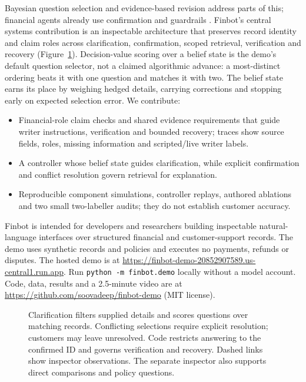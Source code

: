 \documentclass[11pt]{article}
\begin{document}
Bayesian question selection \citep{lindley1956measure} and evidence-based revision
\citep{gao-etal-2023-rarr} address parts of this; financial agents already use confirmation and
guardrails \citep{chua-etal-2025-banking}.
Finbot's central systems contribution is an inspectable architecture that preserves record
identity and claim roles across clarification, confirmation, scoped retrieval, verification and
recovery (Figure~\ref{fig:architecture}). Decision-value scoring over a belief state is the demo's
default question selector, not a claimed algorithmic advance: a most-distinct ordering beats it
with one question and matches it with two. The belief state earns its place by weighing hedged
details, carrying corrections and stopping early on expected selection error. We contribute:
\begin{itemize}\itemsep0pt
\item Financial-role claim checks and shared evidence requirements that guide writer
  instructions, verification and bounded recovery; traces show source fields, roles, missing
  information and scripted/live writer labels.
\item A controller whose belief state guides clarification, while explicit confirmation and
  conflict resolution govern retrieval for explanation.
\item Reproducible component simulations, controller replays, authored ablations and two small
  two-labeller audits; they do not establish customer accuracy.
\end{itemize}
Finbot is intended for developers and researchers building inspectable natural-language
interfaces over structured financial and customer-support records. The demo uses synthetic
records and policies and executes no payments, refunds or disputes.
The hosted demo is at \url{https://finbot-demo-20852907589.us-central1.run.app}.
Run \texttt{python -m finbot.demo} locally without a model account. Code, data, results and a 2.5-minute video are at
\url{https://github.com/soovadeep/finbot-demo} (MIT license).

\begin{figure}[t]
\centering

\caption{Clarification filters supplied details and scores questions over matching records.
Conflicting selections require explicit resolution; customers may leave unresolved. Code restricts
answering to the confirmed ID and governs verification and recovery. Dashed links show inspector
observations. The separate inspector also supports direct comparisons and policy questions.}
\label{fig:architecture}
\end{figure}
\end{document}
